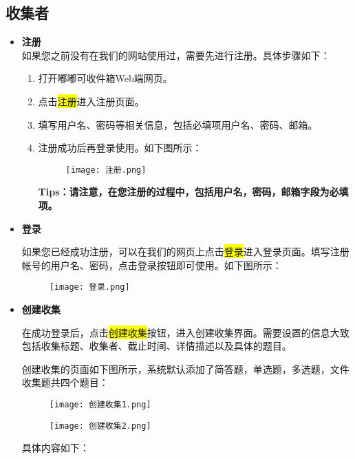 \documentclass[lang=cn,11pt,a4paper]{elegantpaper}
\newcommand{\hlc}[2][yellow]{\colorbox{#1}{#2}} %
\begin{document}
\subsection{收集者}
\begin{itemize}
	\item {\bf 注册}\\
	如果您之前没有在我们的网站使用过，需要先进行注册。具体步骤如下：
	\begin{enumerate}[label=\arabic*)]
		\item 打开嘟嘟可收件箱Web端网页。
		\item 点击\hlc{注册}进入注册页面。
		\item 填写用户名、密码等相关信息，包括必填项用户名、密码、邮箱。
		\item 注册成功后再登录使用。如下图所示：
		\begin{figure}[!htb]
			\centering
			\texttt{[image: 注册.png]}
		\end{figure}
	
	
		{\bf Tips：请注意，在您注册的过程中，包括用户名，密码，邮箱字段为必填项。}
	\end{enumerate}
	\item {\bf 登录}
	
	如果您已经成功注册，可以在我们的网页上点击\hlc{登录}进入登录页面。填写注册帐号的用户名、密码，点击登录按钮即可使用。如下图所示：
	\begin{figure}[!htb]
		\centering
		\texttt{[image: 登录.png]}
	\end{figure}
	\item {\bf 创建收集}
	
	在成功登录后，点击\hlc{创建收集}{\bf }按钮，进入创建收集界面。需要设置的信息大致包括收集标题、收集者、截止时间、详情描述以及具体的题目。
	
	创建收集的页面如下图所示，系统默认添加了简答题，单选题，多选题，文件收集题共四个题目：
	\clearpage
	\begin{figure}[!htb]
		\centering
		\texttt{[image: 创建收集1.png]}
	\end{figure}
	\begin{figure}[!htb]
	\centering
	\texttt{[image: 创建收集2.png]}
\end{figure}
	具体内容如下：
	

\end{itemize}
\end{document}
